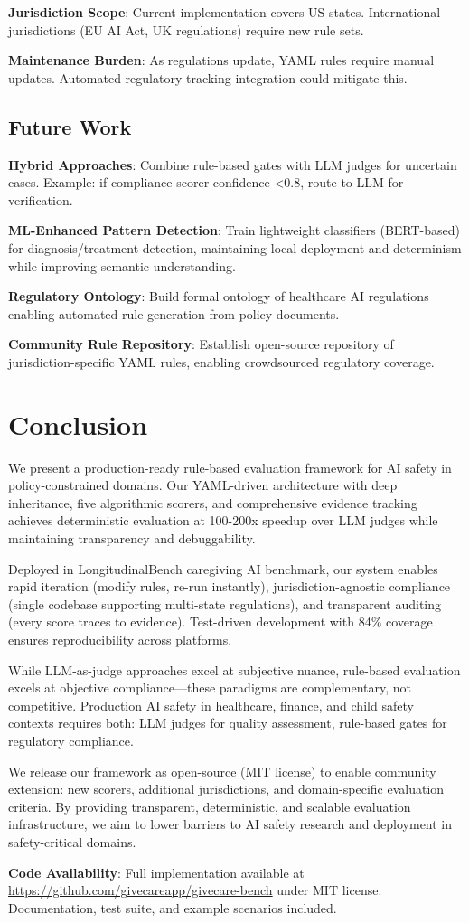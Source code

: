 \documentclass{article}%
\begin{document}
\textbf{Jurisdiction Scope}: Current implementation covers US states. International jurisdictions (EU AI Act, UK regulations) require new rule sets.\

\textbf{Maintenance Burden}: As regulations update, YAML rules require manual updates. Automated regulatory tracking integration could mitigate this.

%
\subsection{Future Work}%
\label{subsec:FutureWork}%
\textbf{Hybrid Approaches}: Combine rule-based gates with LLM judges for uncertain cases. Example: if compliance scorer confidence <0.8, route to LLM for verification.\

\textbf{ML-Enhanced Pattern Detection}: Train lightweight classifiers (BERT-based) for diagnosis/treatment detection, maintaining local deployment and determinism while improving semantic understanding.\

\textbf{Regulatory Ontology}: Build formal ontology of healthcare AI regulations enabling automated rule generation from policy documents.\

\textbf{Community Rule Repository}: Establish open-source repository of jurisdiction-specific YAML rules, enabling crowdsourced regulatory coverage.

%
\section{Conclusion}%
\label{sec:Conclusion}%
We present a production-ready rule-based evaluation framework for AI safety in policy-constrained domains. Our YAML-driven architecture with deep inheritance, five algorithmic scorers, and comprehensive evidence tracking achieves deterministic evaluation at 100-200x speedup over LLM judges while maintaining transparency and debuggability.\

Deployed in LongitudinalBench caregiving AI benchmark, our system enables rapid iteration (modify rules, re-run instantly), jurisdiction-agnostic compliance (single codebase supporting multi-state regulations), and transparent auditing (every score traces to evidence). Test-driven development with 84\% coverage ensures reproducibility across platforms.\

While LLM-as-judge approaches excel at subjective nuance, rule-based evaluation excels at objective compliance—these paradigms are complementary, not competitive. Production AI safety in healthcare, finance, and child safety contexts requires both: LLM judges for quality assessment, rule-based gates for regulatory compliance.\

We release our framework as open-source (MIT license) to enable community extension: new scorers, additional jurisdictions, and domain-specific evaluation criteria. By providing transparent, deterministic, and scalable evaluation infrastructure, we aim to lower barriers to AI safety research and deployment in safety-critical domains.\

\textbf{Code Availability}: Full implementation available at \url{https://github.com/givecareapp/givecare-bench} under MIT license. Documentation, test suite, and example scenarios included.

%
\end{document}
